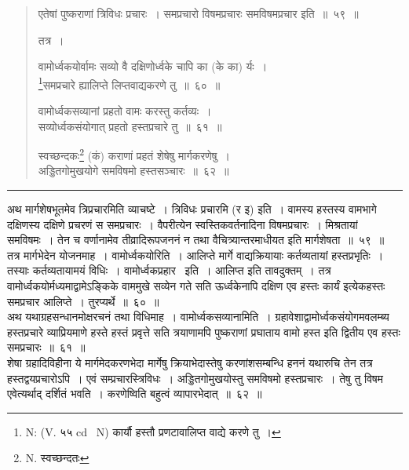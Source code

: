 \documentclass[11pt, openany]{book}
\begin{document}
\newpage

\begin{quote}
{\na एतेषां पुष्कराणां त्रिविधः प्रचारः~। समप्रचारो विषमप्रचारः समविषमप्रचार इति~॥~५९~॥

तत्र~।

वामोर्ध्वकयोर्वामः सव्यो वै दक्षिणोर्ध्वके चापि का (के का) र्यः~।\\
\renewcommand{\thefootnote}{1}\footnote{N: (V. ५५ cd \textendash\ N) कार्यौ हस्तौ प्रणटावालिप्त वाद्ये करणे तु~।}समप्रचारे ह्यालिप्ते लिप्तवाद्यकरणे तु~॥~६०~॥

वामोर्ध्वकसव्यानां प्रहतो वामः करस्तु कर्तव्यः~।\\
सव्योर्ध्वकसंयोगात् प्रहतो हस्तप्रचारे तु~॥~६१~॥

स्वच्छन्दकः\renewcommand{\thefootnote}{2}\footnote{N. स्वच्छन्दतः} (कं) कराणां प्रहतं शेषेषु मार्गकरणेषु~।\\
अड्डितगोमुखयोगे समविषमो हस्तसञ्चारः~॥~६२~॥}
\end{quote}

\hrule

\vspace{2mm}
अथ मार्गशेषभूतमेव {\qtt त्रिप्रचारमिति} व्याचष्टे~। {\qtt त्रिविधः} प्रचारमि  (र इ) इति~। वामस्य हस्तस्य वामभागे दक्षिणस्य दक्षिणे प्रचरणं स समप्रचारः~। {\qtt वैपरीत्येन} स्वस्तिकवर्तनादिना विषमप्रचारः~। {\qtt मिश्रतायां} समविषमः~। तेन च वर्णानामेव तीव्रादिरूपजननं न तथा वैचित्र्यान्तरमाधीयत इति मार्गशेषता~॥~५९~॥\\

तत्र मार्गभेदेन योजनमाह~। {\qtt वामोर्ध्वकयोरिति}~। आलिप्ते मार्गे वाद्यक्रियायाः कर्तव्यतायां हस्तप्रभृतिः~। तस्याः कर्तव्यतायामयं विधिः~। {\qtt वामोर्ध्वकप्रहार} \textendash\  इति~। आलिप्त इति तावदुक्तम्~। तत्र वामोर्ध्वकयोर्मध्यमाद्वामेऽङ्किके वाममुखे सव्येन गते सति ऊर्ध्वकेनापि दक्षिण एव हस्तः कार्यं इत्येकहस्तः समप्रचार आलिप्ते~। तुरप्यर्थे~॥~६०~॥\\

अथ यथाग्रहसन्धानमोक्षरचनं तथा विधिमाह~। {\qtt वामोर्ध्वकसव्यानामिति}~। ग्रहावेशाद्वामोर्ध्वकसंयोगमवलम्ब्य हस्तप्रचारे व्याप्रियमाणे हस्ते हस्तं प्रवृत्ते सति त्रयाणामपि पुष्कराणां प्रघाताय वामो हस्त इति द्वितीय एव हस्तः समप्रचारः~॥~६१~॥\\

शेषा ग्रहादिविहीना ये मार्गमेदकरणभेदा मार्गेषु क्रियाभेदास्तेषु करणांशसम्बन्धि हननं यथारुचि तेन तत्र हस्तद्वयप्रचारोऽपि~। एवं {\qtt सम्प्रचारस्त्रिविधः}~। अड्डितगोमुखयोस्तु समविषमो हस्तप्रचारः~। तेषु तु विषम एवेत्यर्थाद् दर्शितं भवति~। करणेष्विति बहुत्वं व्यापारभेदात्~॥~६२~॥
\end{document}
